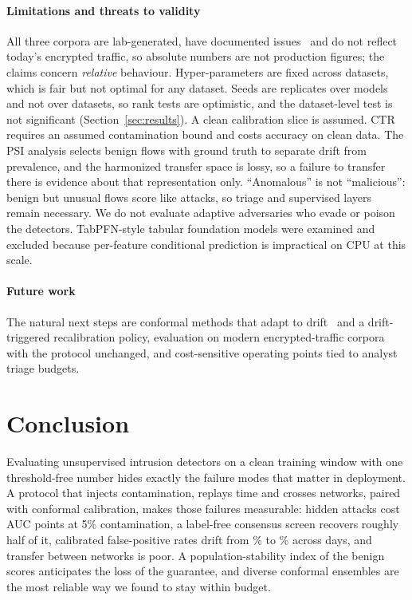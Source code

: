\documentclass[journal]{IEEEtran}
\begin{document}
\paragraph*{Limitations and threats to validity}
All three corpora are lab-generated, have documented issues~\cite{engelen2021} and do not reflect today's encrypted traffic, so absolute numbers are not production figures; the claims concern \emph{relative} behaviour. Hyper-parameters are fixed across datasets, which is fair but not optimal for any dataset. Seeds are replicates over models and not over datasets, so rank tests are optimistic, and the dataset-level test is not significant (Section~\ref{sec:results}). A clean calibration slice is assumed. CTR requires an assumed contamination bound and costs accuracy on clean data. The PSI analysis selects benign flows with ground truth to separate drift from prevalence, and the harmonized transfer space is lossy, so a failure to transfer there is evidence about that representation only. ``Anomalous'' is not ``malicious'': benign but unusual flows score like attacks, so triage and supervised layers remain necessary. We do not evaluate adaptive adversaries who evade or poison the detectors. TabPFN-style tabular foundation models were examined and excluded because per-feature conditional prediction is impractical on CPU at this scale.

\paragraph*{Future work}
The natural next steps are conformal methods that adapt to drift~\cite{gibbs2021,tibshirani2019,barber2023} and a drift-triggered recalibration policy, evaluation on modern encrypted-traffic corpora with the protocol unchanged, and cost-sensitive operating points tied to analyst triage budgets.

\section{Conclusion}
Evaluating unsupervised intrusion detectors on a clean training window with one threshold-free number hides exactly the failure modes that matter in deployment. A protocol that injects contamination, replays time and crosses networks, paired with conformal calibration, makes those failures measurable: hidden attacks cost \meanDropFivePts{} AUC points at 5\% contamination, a label-free consensus screen recovers roughly half of it, calibrated false-positive rates drift from \driftBestFpr\% to \driftWorstFpr\% across days, and transfer between networks is poor. A population-stability index of the benign scores anticipates the loss of the guarantee, and diverse conformal ensembles are the most reliable way we found to stay within budget.
\end{document}
